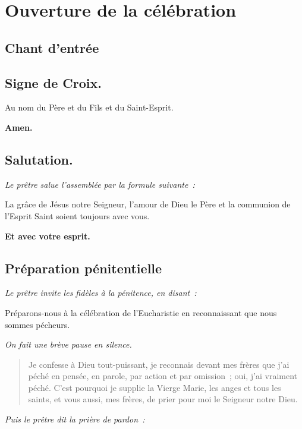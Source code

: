 \section*{Ouverture de la célébration}

\subsection*{Chant d'entrée}


\subsection*{Signe de Croix.}



Au nom du Père et du Fils et du Saint-Esprit.

{\bf Amen.}

\subsection*{Salutation.}

\emph{Le prêtre salue l'assemblée par la formule suivante~:}

La grâce de Jésus notre Seigneur,
l'amour de Dieu le Père
et la communion de l'Esprit Saint
soient toujours avec vous.

{\bf Et avec votre esprit.}


\subsection*{Préparation pénitentielle}

\emph{Le prêtre invite les fidèles à la pénitence, en disant~:}

Préparons-nous à la célébration de l'Eucharistie
en reconnaissant que nous sommes pécheurs.

\emph{On fait une brève pause en silence.}

{\bf
\begin{verse}
\noindent
Je confesse à Dieu tout-puissant,\newline
je reconnais devant mes frères\newline
que j'ai péché\newline
en pensée, en parole,\newline
par action et par omission~;\newline
oui, j'ai vraiment péché.\newline
C'est pourquoi je supplie la Vierge Marie,\newline
les anges et tous les saints,\newline
et vous aussi, mes frères,\newline
de prier pour moi le Seigneur notre Dieu.\newline
\end{verse}
}
\emph{Puis le prêtre dit la prière de pardon~:}


